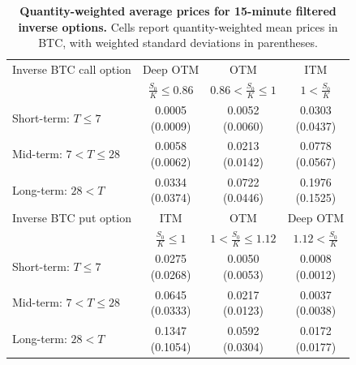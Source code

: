 \begin{table}[htbp]
\centering
\begin{tabular}{lccc}
\hline
Inverse BTC call option & Deep OTM & OTM & ITM \\
 & $\frac{S_0}{K} \leq 0.86$ & $0.86 < \frac{S_0}{K} \leq 1$ & $1 < \frac{S_0}{K}$ \\
\hline
Short-term: $T \leq 7$ & \makecell{0.0005\\(0.0009)} & \makecell{0.0052\\(0.0060)} & \makecell{0.0303\\(0.0437)} \\
Mid-term: $7 < T \leq 28$ & \makecell{0.0058\\(0.0062)} & \makecell{0.0213\\(0.0142)} & \makecell{0.0778\\(0.0567)} \\
Long-term: $28 < T$ & \makecell{0.0334\\(0.0374)} & \makecell{0.0722\\(0.0446)} & \makecell{0.1976\\(0.1525)} \\
\hline
Inverse BTC put option & ITM & OTM & Deep OTM \\
 & $\frac{S_0}{K} \leq 1$ & $1 < \frac{S_0}{K} \leq 1.12$ & $1.12 < \frac{S_0}{K}$ \\
\hline
Short-term: $T \leq 7$ & \makecell{0.0275\\(0.0268)} & \makecell{0.0050\\(0.0053)} & \makecell{0.0008\\(0.0012)} \\
Mid-term: $7 < T \leq 28$ & \makecell{0.0645\\(0.0333)} & \makecell{0.0217\\(0.0123)} & \makecell{0.0037\\(0.0038)} \\
Long-term: $28 < T$ & \makecell{0.1347\\(0.1054)} & \makecell{0.0592\\(0.0304)} & \makecell{0.0172\\(0.0177)} \\
\hline
\end{tabular}
\caption{\textbf{Quantity-weighted average prices for 15-minute filtered inverse options.} Cells report quantity-weighted mean prices in BTC, with weighted standard deviations in parentheses.}
\label{tab:filtered_weighted_average_prices_inverse_options}

\end{table}



\clearpage
